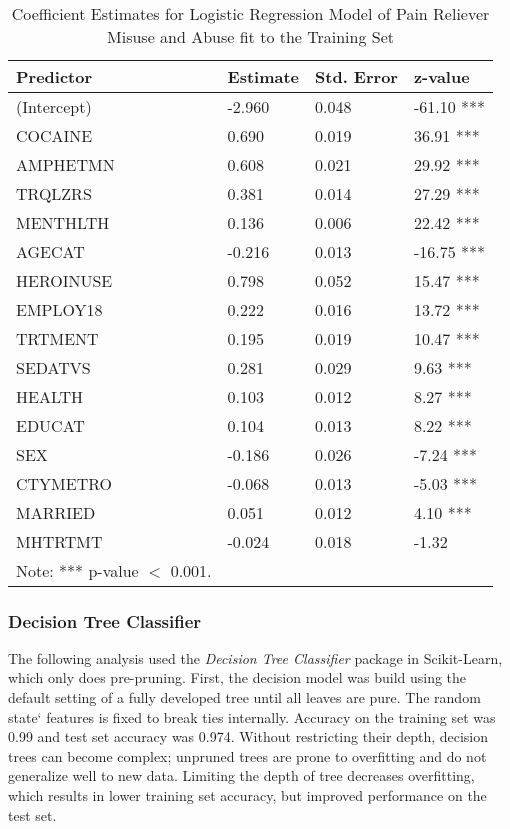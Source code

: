 \\\documentclass[sigconf]{acmart}
\begin{document}

\begin{table}
  \caption{Coefficient Estimates for Logistic Regression Model 
  of Pain Reliever Misuse and Abuse fit to the Training Set}
  \label{tab:freq}
  \begin{tabular}{llll}
    \toprule
    Predictor&  Estimate& Std. Error& z-value  \\    
    \midrule
    (Intercept)& -2.960 &   0.048 & -61.10 ***  \\
    COCAINE  &    0.690 &   0.019 &  36.91 ***  \\
    AMPHETMN &    0.608 &   0.021 &  29.92 ***  \\
    TRQLZRS  &    0.381 &   0.014 &  27.29 ***  \\
    MENTHLTH &    0.136 &   0.006 &  22.42 ***  \\
    AGECAT   &   -0.216 &   0.013 & -16.75 ***  \\
    HEROINUSE&    0.798 &   0.052 &  15.47 ***  \\  
    EMPLOY18 &    0.222 &   0.016 &  13.72 ***  \\
    TRTMENT  &    0.195 &   0.019 &  10.47 ***  \\
    SEDATVS  &    0.281 &   0.029 &   9.63 ***  \\   
    HEALTH   &    0.103 &   0.012 &   8.27 ***  \\
    EDUCAT   &    0.104 &   0.013 &   8.22 ***  \\   
    SEX      &   -0.186 &   0.026 &  -7.24 ***  \\
    CTYMETRO &   -0.068 &   0.013 &  -5.03 ***  \\
    MARRIED  &    0.051 &   0.012 &   4.10 ***  \\
    MHTRTMT  &   -0.024 &   0.018 &  -1.32     \\
    \bottomrule
    Note: *** p-value $<$ 0.001. &  &  
  \end{tabular}
\end{table}


\subsubsection{Decision Tree Classifier}

The following analysis used the \emph{Decision Tree Classifier} package in 
Scikit-Learn, which only does pre-pruning. First, the decision model was build
using the default setting of a fully developed tree until all leaves are pure. 
The random state` features is fixed to break ties internally. Accuracy on the
training set was 0.99 and test set accuracy was 0.974. Without restricting 
their depth, decision trees can become complex; unpruned trees are prone to 
overfitting and do not generalize well to new data. Limiting the depth of 
tree decreases overfitting, which results in lower training set accuracy, 
but improved performance on the test set. 
\end{document}
